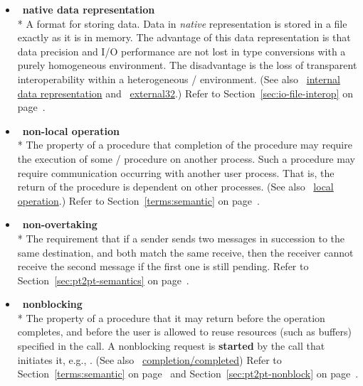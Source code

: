 \begin{itemize}
\label{glossary:native_data_representation}
\item  ~\hypertarget{glossary:native_data_representation}{\textbf{native data representation}} \\*
A format for storing data.
Data in \emph{native} representation is stored in a file exactly
as it is in memory.
The advantage of this data representation is that
data precision and I/O performance are not lost in type conversions
with a purely homogeneous environment.
The disadvantage is the loss of transparent interoperability within a
heterogeneous \MPI/ environment.
(See also ~\hyperlink{glossary:internal_data_representation}{internal data representation} and ~\hyperlink{glossary:external32}{external32}.)
Refer to Section~\ref{sec:io-file-interop} on page~\pageref{sec:io-file-interop}.

\label{glossary:non-local_operation}
\item  ~\hypertarget{glossary:non-local_operation}{\textbf{non-local operation}} \\*
The property of a procedure that completion of the procedure may require
the execution of some \MPI/ procedure on another process.  Such a
procedure may require
communication occurring with another user process.
That is, the return of the procedure is dependent on other processes.
(See also ~\hyperlink{glossary:local_operation}{local operation}.)
Refer to Section~\ref{terms:semantic} on page~\pageref{terms:semantic}.

\label{glossary:non-overtaking}
\item  ~\hypertarget{glossary:non-overtaking}{\textbf{non-overtaking}} \\*
The requirement that
if a sender sends two messages in succession to the same destination, and
both match the same receive, then the receiver cannot receive the
second message if the first one is still pending.
Refer to Section~\ref{sec:pt2pt-semantics} on page~\pageref{sec:pt2pt-semantics}.

\label{glossary:nonblocking}
\item  ~\hypertarget{glossary:nonblocking}{\textbf{nonblocking}} \\*
The property of a procedure that it may return before the
operation completes, and before the user is allowed to reuse
resources (such as buffers) specified in the call.
A nonblocking request is {\bf started} by the call that initiates it, e.g.,
.
(See also ~\hyperlink{glossary:completion_completed}{completion/completed})
Refer to Section~\ref{terms:semantic} on page~\pageref{terms:semantic} and
Section~\ref{sec:pt2pt-nonblock} on page~\pageref{sec:pt2pt-nonblock}.


\end{itemize}
